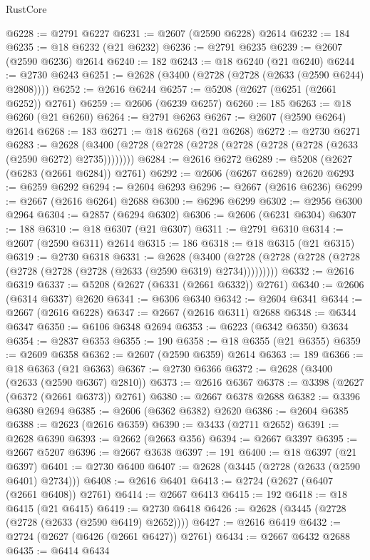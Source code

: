 \begin{lexlean}{RustCore}
\begin{coremodule}
@6228 := @2791 @6227
@6231 := @2607 (@2590 @6228) @2614
@6232 := 184
@6235 := @18 @6232 (@21 @6232)
@6236 := @2791 @6235
@6239 := @2607 (@2590 @6236) @2614
@6240 := 182
@6243 := @18 @6240 (@21 @6240)
@6244 := @2730 @6243
@6251 := @2628 (@3400 (@2728 (@2728 (@2633 (@2590 @6244) @2808))))
@6252 := @2616 @6244
@6257 := @5208 (@2627 (@6251 (@2661 @6252)) @2761)
@6259 := @2606 (@6239 @6257)
@6260 := 185
@6263 := @18 @6260 (@21 @6260)
@6264 := @2791 @6263
@6267 := @2607 (@2590 @6264) @2614
@6268 := 183
@6271 := @18 @6268 (@21 @6268)
@6272 := @2730 @6271
@6283 := @2628 (@3400 (@2728 (@2728 (@2728 (@2728 (@2728 (@2728 (@2633 (@2590 @6272) @2735))))))))
@6284 := @2616 @6272
@6289 := @5208 (@2627 (@6283 (@2661 @6284)) @2761)
@6292 := @2606 (@6267 @6289) @2620
@6293 := @6259 @6292
@6294 := @2604 @6293
@6296 := @2667 (@2616 @6236)
@6299 := @2667 (@2616 @6264) @2688
@6300 := @6296 @6299
@6302 := @2956 @6300 @2964
@6304 := @2857 (@6294 @6302)
@6306 := @2606 (@6231 @6304)
@6307 := 188
@6310 := @18 @6307 (@21 @6307)
@6311 := @2791 @6310
@6314 := @2607 (@2590 @6311) @2614
@6315 := 186
@6318 := @18 @6315 (@21 @6315)
@6319 := @2730 @6318
@6331 := @2628
    (@3400 (@2728 (@2728 (@2728 (@2728 (@2728 (@2728 (@2728 (@2633 (@2590 @6319) @2734)))))))))
@6332 := @2616 @6319
@6337 := @5208 (@2627 (@6331 (@2661 @6332)) @2761)
@6340 := @2606 (@6314 @6337) @2620
@6341 := @6306 @6340
@6342 := @2604 @6341
@6344 := @2667 (@2616 @6228)
@6347 := @2667 (@2616 @6311) @2688
@6348 := @6344 @6347
@6350 := @6106 @6348 @2694
@6353 := @6223 (@6342 @6350) @3634
@6354 := @2837 @6353
@6355 := 190
@6358 := @18 @6355 (@21 @6355)
@6359 := @2609 @6358
@6362 := @2607 (@2590 @6359) @2614
@6363 := 189
@6366 := @18 @6363 (@21 @6363)
@6367 := @2730 @6366
@6372 := @2628 (@3400 (@2633 (@2590 @6367) @2810))
@6373 := @2616 @6367
@6378 := @3398 (@2627 (@6372 (@2661 @6373)) @2761)
@6380 := @2667 @6378 @2688
@6382 := @3396 @6380 @2694
@6385 := @2606 (@6362 @6382) @2620
@6386 := @2604 @6385
@6388 := @2623 (@2616 @6359)
@6390 := @3433 (@2711 @2652)
@6391 := @2628 @6390
@6393 := @2662 (@2663 @356)
@6394 := @2667 @3397
@6395 := @2667 @5207
@6396 := @2667 @3638
@6397 := 191
@6400 := @18 @6397 (@21 @6397)
@6401 := @2730 @6400
@6407 := @2628 (@3445 (@2728 (@2633 (@2590 @6401) @2734)))
@6408 := @2616 @6401
@6413 := @2724 (@2627 (@6407 (@2661 @6408)) @2761)
@6414 := @2667 @6413
@6415 := 192
@6418 := @18 @6415 (@21 @6415)
@6419 := @2730 @6418
@6426 := @2628 (@3445 (@2728 (@2728 (@2633 (@2590 @6419) @2652))))
@6427 := @2616 @6419
@6432 := @2724 (@2627 (@6426 (@2661 @6427)) @2761)
@6434 := @2667 @6432 @2688
@6435 := @6414 @6434

\end{coremodule}
\end{lexlean}
